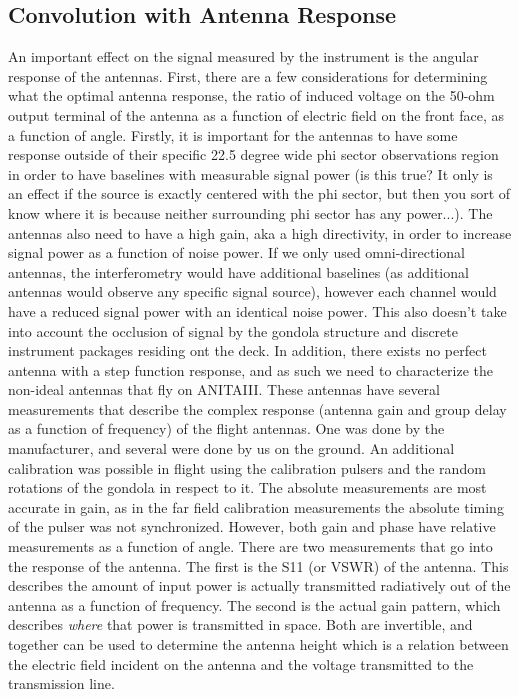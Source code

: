 	\subsection{Convolution with Antenna Response}
		An important effect on the signal measured by the instrument is the angular response of the antennas.  First, there are a few considerations for determining what the optimal antenna response, the ratio of induced voltage on the 50-ohm output terminal of the antenna as a function of electric field on the front face, as a function of angle.  Firstly, it is important for the antennas to have some response outside of their specific 22.5 degree wide phi sector observations region in order to have baselines with measurable signal power (is this true?  It only is an effect if the source is exactly centered with the phi sector, but then you sort of know where it is because neither surrounding phi sector has any power...).  The antennas also need to have a high gain, aka a high directivity, in order to increase signal power as a function of noise power.  If we only used omni-directional antennas, the interferometry would have additional baselines (as additional antennas would observe any specific signal source), however each channel would have a reduced signal power with an identical noise power.  This also doesn't take into account the occlusion of signal by the gondola structure and discrete instrument packages residing ont the deck.  In addition, there exists no perfect antenna with a step function response, and as such we need to characterize the non-ideal antennas that fly on ANITAIII.
		These antennas have several measurements that describe the complex response (antenna gain and group delay as a function of frequency) of the flight antennas.  One was done by the manufacturer, and several were done by us on the ground.  An additional calibration was possible in flight using the calibration pulsers and the random rotations of the gondola in respect to it.  The absolute measurements are most accurate in gain, as in the far field calibration measurements the absolute timing of the pulser was not synchronized.  However, both gain and phase have relative measurements as a function of angle.
		There are two measurements that go into the response of the antenna.  The first is the S11 (or VSWR) of the antenna.  This describes the amount of input power is actually transmitted radiatively out of the antenna as a function of frequency.  The second is the actual gain pattern, which describes \textit{where} that power is transmitted in space.  Both are invertible, and together can be used to determine the antenna height which is a relation between the electric field incident on the antenna and the voltage transmitted to the transmission line.
